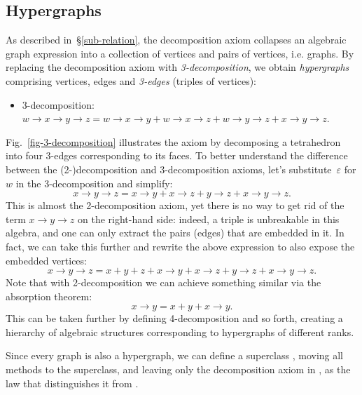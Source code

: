 \subsection{Hypergraphs}\label{sub-hypergraphs}

As described in~\S\ref{sub-relation}, the decomposition axiom collapses an algebraic
graph expression into a collection of vertices and pairs of vertices, i.e. graphs. By replacing
the decomposition axiom with \emph{3-decomposition}, we obtain \emph{hypergraphs} comprising
vertices, edges and \emph{3-edges} (triples of vertices):

\begin{itemize}
    \item 3-decomposition: $w \rightarrow x \rightarrow y \rightarrow z =
    w \rightarrow x \rightarrow y + w \rightarrow x \rightarrow z +
    w \rightarrow y \rightarrow z + x \rightarrow y \rightarrow z$.
\end{itemize}

Fig.~\ref{fig-3-decomposition} illustrates the axiom by decomposing a tetrahedron
into four 3-edges corresponding to its faces. To better understand the difference
between the (2-)decomposition and 3-decomposition
axioms, let's substitute~$\varepsilon$ for $w$ in the 3-decomposition and simplify:
\[
x \rightarrow y \rightarrow z = x \rightarrow y + x \rightarrow z + y \rightarrow z
+ x \rightarrow y \rightarrow z.
\]
This is almost the 2-decomposition axiom, yet there is no way to get rid
of the term $x \rightarrow y \rightarrow z$ on the right-hand side: indeed, a triple is
unbreakable
in this algebra, and one can only extract the pairs (edges) that are embedded in it.
In fact, we can take this further and rewrite the above expression to also expose the
embedded vertices:
\[
x \rightarrow y \rightarrow z = x + y + z + x \rightarrow y + x \rightarrow z
+ y \rightarrow z + x \rightarrow y \rightarrow z.
\]
Note that with 2-decomposition we can achieve something similar via the absorption theorem:
\[
x \rightarrow y = x + y + x \rightarrow y.
\]
This can be taken further by defining 4-decomposition and so forth, creating a hierarchy
of algebraic structures corresponding to hypergraphs of different ranks.

Since every graph is also a hypergraph, we can define a superclass
, moving all  methods to the superclass, and
leaving only the decomposition axiom in , as the law that distinguishes it from
.

